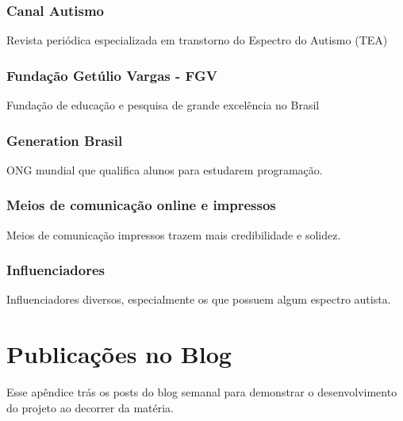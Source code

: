 \begin{apendicesenv}
	\subsection{Canal Autismo}
	Revista periódica especializada em transtorno do Espectro do Autismo (TEA)
	
	\subsection{Fundação Getúlio Vargas - FGV}
	Fundação de educação e pesquisa de grande excelência no Brasil
	
	\subsection{Generation Brasil}
	ONG mundial que qualifica alunos para estudarem programação.
	
	\subsection{Meios de comunicação online e impressos}
	Meios de comunicação impressos trazem mais credibilidade e solidez.
	
	\subsection{Influenciadores}
	Influenciadores diversos, especialmente os que possuem algum espectro autista. 
	
	
	
	\chapter{Publicações no Blog}
	
	Esse apêndice trás os posts do blog semanal para demonstrar o desenvolvimento do projeto ao decorrer da matéria. 
	
	
	
	
\end{apendicesenv}

